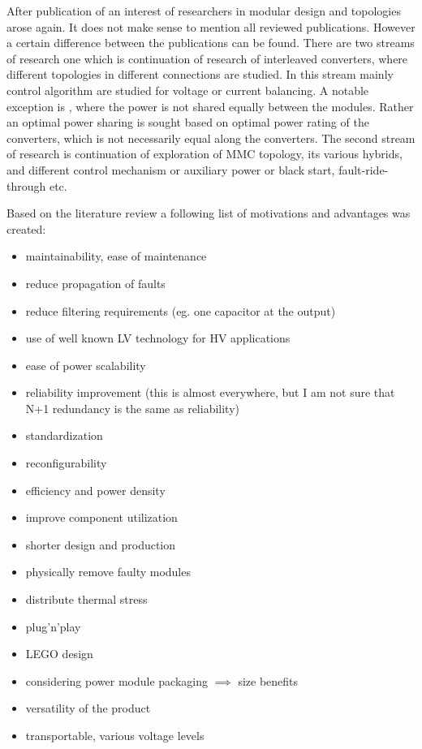 \documentclass[]{scrartcl}
\begin{document}
After publication of \cite{Marquardt2002} an interest of researchers in modular design and topologies arose again. It does not make sense to mention all reviewed publications. However a certain difference between the publications can be found. There are two streams of research one which is continuation of research of interleaved converters, where different topologies in different connections are studied. In this stream mainly control algorithm are studied for voltage or current balancing. A notable exception is \cite{Dc-dc2016}, where the power is not shared equally between the modules. Rather an optimal power sharing is sought based on optimal power rating of the converters, which is not necessarily equal along the converters. The second stream of research is continuation of exploration of MMC topology, its various hybrids, and different control mechanism or auxiliary power or black start, fault-ride-through etc.

Based on the literature review a following list of motivations and advantages was created:
\begin{itemize}
	\item maintainability, ease of maintenance
	\item reduce propagation of faults
	\item reduce filtering requirements (eg. one capacitor at the output)
	\item use of well known LV technology for HV applications 
	\item ease of power scalability
	\item reliability improvement (this is almost everywhere, but I am not sure that N+1 redundancy is the same as reliability)
	\item standardization
	\item reconfigurability 
	\item efficiency and power density
	\item improve component utilization
	\item shorter design and production
	\item physically remove faulty modules
	\item distribute thermal stress
	\item plug'n'play
	\item LEGO design
	\item considering power module packaging $\implies$ size benefits
	\item versatility of the product
	\item transportable, various voltage levels
\end{itemize}                   
\newpage
\end{document}
